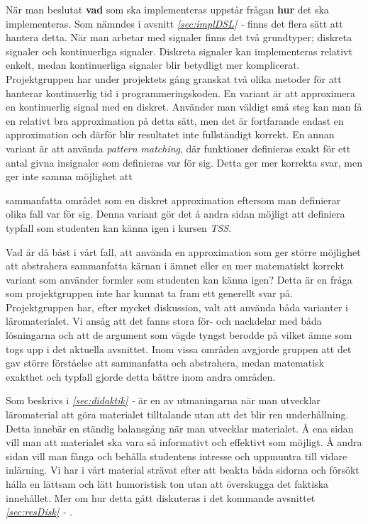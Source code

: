 \documentclass[12pt,a4paper,twoside,openright]{article}
\begin{document}
När man beslutat \textbf{vad} som ska implementeras uppstår frågan
\textbf{hur} det ska implementeras. Som nämndes i
avsnitt \textit{\ref{sec:implDSL} - }
finns det flera sätt att hantera detta. När man arbetar med signaler
finns det två grundtyper; diskreta signaler och kontinuerliga
signaler. Diskreta signaler kan implementeras relativt enkelt, medan
kontinuerliga signaler blir betydligt mer komplicerat. Projektgruppen
har under projektets gång granskat två olika metoder för att hanterar
kontinuerlig tid i programmeringskoden. En variant är att approximera
en kontinuerlig signal med en diskret. Använder man väldigt små steg
kan man få en relativt bra approximation på detta sätt, men det är
fortfarande endast en approximation och därför blir resultatet inte
fullständigt korrekt.
En annan variant är att använda \textit{pattern matching}, där
funktioner definieras exakt för ett antal givna insignaler som
definieras var för sig. Detta ger mer korrekta svar, men ger inte
samma möjlighet att

sammanfatta
området som en diskret approximation eftersom man definierar
olika fall var för sig. Denna
variant gör det å andra sidan möjligt att definiera typfall som
studenten kan känna igen i kursen \textit{TSS}.

Vad är då bäst i vårt fall, att använda en approximation som ger
större möjlighet att abstrahera
sammanfatta kärnan i ämnet eller
en mer matematiskt korrekt variant som använder formler som studenten
kan känna igen? Detta är en fråga som projektgruppen inte har kunnat
ta fram ett generellt svar på. Projektgruppen har, efter mycket
diskussion, valt att använda båda varianter i läromaterialet. Vi ansåg
att det fanns stora för- och nackdelar med båda lösningarna och att de
argument som vägde tyngst berodde på vilket ämne som togs upp i det
aktuella avsnittet. Inom vissa områden avgjorde gruppen att det gav
större förståelse att sammanfatta och abstrahera, medan matematisk
exakthet och typfall gjorde detta bättre inom andra områden.

Som beskrivs i \textit{\ref{sec:didaktik} - } är en av
utmaningarna när man utvecklar läromaterial att göra materialet
tilltalande utan att det blir ren underhållning. Detta innebär en
ständig balansgång när man utvecklar materialet. Å ena sidan vill man
att materialet ska vara så informativt och effektivt som möjligt. Å
andra sidan vill man fånga och behålla studentens intresse och
uppmuntra till vidare inlärning. Vi har i vårt material strävat efter
att beakta båda sidorna och försökt hålla en lättsam och lätt
humoristisk ton utan att överskugga det faktiska innehållet. Mer om
hur detta gått diskuteras i det kommande avsnittet \textit{\ref{sec:resDisk} - }.
\end{document}
